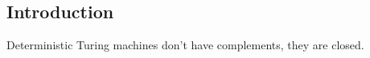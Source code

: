 

\subsection{Introduction}

Deterministic Turing machines don't have complements, they are closed.
